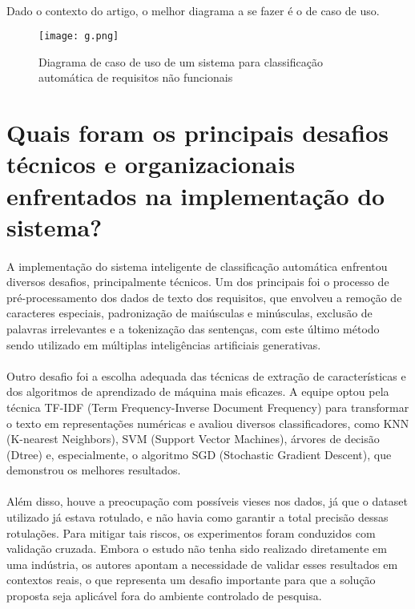 \documentclass{article}
\begin{document}
\paragraph{} Dado o contexto do artigo, o melhor diagrama a se fazer é o de caso de uso. 

\begin{figure}[ht!]
    \centering
    \texttt{[image: g.png]}
    \caption{Diagrama de caso de uso de um sistema para classificação automática de requisitos não funcionais}
    \label{fig:questao1}
\end{figure}

\section{Quais foram os principais desafios técnicos e organizacionais enfrentados na implementação do sistema?} 

\paragraph{} A implementação do sistema inteligente de classificação automática enfrentou diversos desafios, principalmente técnicos. Um dos principais foi o processo de pré-processamento dos dados de texto dos requisitos, que envolveu a remoção de caracteres especiais, padronização de maiúsculas e minúsculas, exclusão de palavras irrelevantes e a tokenização das sentenças, com este último método sendo utilizado em múltiplas inteligências artificiais generativas.
\paragraph{} Outro desafio foi a escolha adequada das técnicas de extração de características e dos algoritmos de aprendizado de máquina mais eficazes. A equipe optou pela técnica TF-IDF (Term Frequency-Inverse Document Frequency) para transformar o texto em representações numéricas e avaliou diversos classificadores, como KNN (K-nearest Neighbors), SVM (Support Vector Machines), árvores de decisão (Dtree) e, especialmente, o algoritmo SGD (Stochastic Gradient Descent), que demonstrou os melhores resultados.
\paragraph{} Além disso, houve a preocupação com possíveis vieses nos dados, já que o dataset utilizado já estava rotulado, e não havia como garantir a total precisão dessas rotulações. Para mitigar tais riscos, os experimentos foram conduzidos com validação cruzada. Embora o estudo não tenha sido realizado diretamente em uma indústria, os autores apontam a necessidade de validar esses resultados em contextos reais, o que representa um desafio importante para que a solução proposta seja aplicável fora do ambiente controlado de pesquisa.
\end{document}
